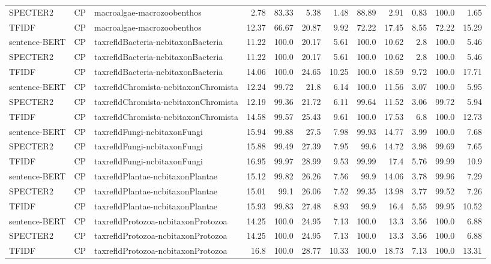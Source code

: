 \begin{table}[h]
\begin{tabular}{|l|c|l|r|r|r|r|r|r|r|r|r|}
	SPECTER2  & CP & macroalgae-macrozoobenthos  & 2.78 & 83.33 & 5.38 & 1.48 & 88.89 & 2.91 & 0.83 & 100.0 & 1.65\\
	TFIDF  & CP & macroalgae-macrozoobenthos  & 12.37 & 66.67 & 20.87 & 9.92 & 72.22 & 17.45 & 8.55 & 72.22 & 15.29\\
	\hline
	sentence-BERT  & CP & taxrefldBacteria-ncbitaxonBacteria  & 11.22 & 100.0 & 20.17 & 5.61 & 100.0 & 10.62 & 2.8 & 100.0 & 5.46\\
	SPECTER2  & CP & taxrefldBacteria-ncbitaxonBacteria  & 11.22 & 100.0 & 20.17 & 5.61 & 100.0 & 10.62 & 2.8 & 100.0 & 5.46\\
	TFIDF  & CP & taxrefldBacteria-ncbitaxonBacteria  & 14.06 & 100.0 & 24.65 & 10.25 & 100.0 & 18.59 & 9.72 & 100.0 & 17.71\\
	\hline
	sentence-BERT  & CP & taxrefldChromista-ncbitaxonChromista  & 12.24 & 99.72 & 21.8 & 6.14 & 100.0 & 11.56 & 3.07 & 100.0 & 5.95\\
	SPECTER2  & CP & taxrefldChromista-ncbitaxonChromista  & 12.19 & 99.36 & 21.72 & 6.11 & 99.64 & 11.52 & 3.06 & 99.72 & 5.94\\
	TFIDF  & CP & taxrefldChromista-ncbitaxonChromista  & 14.58 & 99.57 & 25.43 & 9.61 & 100.0 & 17.53 & 6.8 & 100.0 & 12.73\\
	\hline
	sentence-BERT  & CP & taxrefldFungi-ncbitaxonFungi  & 15.94 & 99.88 & 27.5 & 7.98 & 99.93 & 14.77 & 3.99 & 100.0 & 7.68\\
	SPECTER2  & CP & taxrefldFungi-ncbitaxonFungi  & 15.88 & 99.49 & 27.39 & 7.95 & 99.6 & 14.72 & 3.98 & 99.69 & 7.65\\
	TFIDF  & CP & taxrefldFungi-ncbitaxonFungi  & 16.95 & 99.97 & 28.99 & 9.53 & 99.99 & 17.4 & 5.76 & 99.99 & 10.9\\
	\hline
	sentence-BERT  & CP & taxrefldPlantae-ncbitaxonPlantae  & 15.12 & 99.82 & 26.26 & 7.56 & 99.9 & 14.06 & 3.78 & 99.96 & 7.29\\
	SPECTER2  & CP & taxrefldPlantae-ncbitaxonPlantae  & 15.01 & 99.1 & 26.06 & 7.52 & 99.35 & 13.98 & 3.77 & 99.52 & 7.26\\
	TFIDF  & CP & taxrefldPlantae-ncbitaxonPlantae  & 15.93 & 99.83 & 27.48 & 8.93 & 99.9 & 16.4 & 5.55 & 99.95 & 10.52\\
	\hline
	sentence-BERT  & CP & taxrefldProtozoa-ncbitaxonProtozoa  & 14.25 & 100.0 & 24.95 & 7.13 & 100.0 & 13.3 & 3.56 & 100.0 & 6.88\\
	SPECTER2  & CP & taxrefldProtozoa-ncbitaxonProtozoa  & 14.25 & 100.0 & 24.95 & 7.13 & 100.0 & 13.3 & 3.56 & 100.0 & 6.88\\
	TFIDF  & CP & taxrefldProtozoa-ncbitaxonProtozoa  & 16.8 & 100.0 & 28.77 & 10.33 & 100.0 & 18.73 & 7.13 & 100.0 & 13.31\\
	\hline
    \end{tabular}
\end{table}
